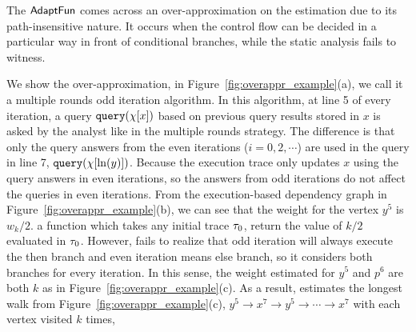 \begin{example}
\label{ex:overapproximate}
The $\textsf{AdaptFun}$ comes across an over-approximation on the estimation due to its path-insensitive nature. 
It occurs when the control flow can be decided in a particular way in front of conditional branches, while the static analysis fails to witness. 

We show the over-approximation, in Figure~\ref{fig:overappr_example}(a),
we call it a multiple rounds odd iteration algorithm. In this algorithm, at line 5 of every iteration, 
a query ${\tt query}(\chi[x])$ based on previous query results stored in $x$ is asked by the analyst like in the multiple rounds strategy. The difference is that only the query answers from the even iterations ($i =0, 2, \cdots $) are 
used in the query 
in line 7, ${\tt query}(\chi[\ln(y)])$.
  Because the execution trace only updates 
$x$ using the query answers in even iterations, so the answers from odd iterations do not affect the queries in even iterations. 
From the execution-based dependency graph in Figure~\ref{fig:overappr_example}(b), 
we can see that the weight for the vertex $y^5$ is 
$w_k/2$. a function which takes any initial trace $\mathtt{\tau}_0$, return the value of $k/2$ evaluated in $\mathtt{\tau}_0$.  
However, {\THESYSTEM} fails to realize that odd iteration will always execute the then branch and even iteration means else branch, so 
it considers both branches for every iteration. 
In this sense, the weight estimated for $y^5$ and $p^6$ are both 
$k$ as in Figure~\ref{fig:overappr_example}(c).
As a result, {\THESYSTEM}  estimates the longest walk from Figure~\ref{fig:overappr_example}(c),
$y^5  \to x^7  \to y^5  \to \cdots \to x^7  $ with each vertex visited $k$ times,

\end{example}
